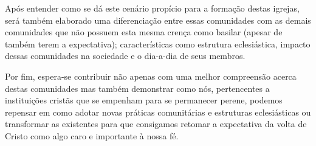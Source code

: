 \documentclass[
    article,            %
	12pt,				%
	oneside,			%
	a4paper,			%
	english,			%
	french,				%
	spanish,			%
	brazil				%
	]{abntex2}
\begin{document}
Após entender como se dá este cenário propício para a formação destas igrejas, será também elaborado uma diferenciação entre essas comunidades com as demais comunidades que não possuem esta mesma crença como basilar (apesar de também terem a expectativa); características como estrutura eclesiástica, impacto dessas comunidades na sociedade e o dia-a-dia de seus membros.

Por fim, espera-se contribuir não apenas com uma melhor compreensão acerca destas comunidades mas também demonstrar como nós, pertencentes a instituições cristãs que se empenham para se permanecer perene, podemos repensar em como adotar novas práticas comunitárias e estruturas eclesiásticas ou transformar as existentes para que consigamos retomar a expectativa da volta de Cristo como algo caro e importante à nossa fé.

\pagebreak
\end{document}
